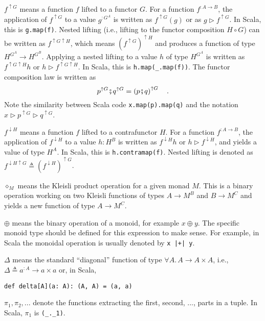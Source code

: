 $f^{\uparrow G}$ means a function $f$ lifted to a functor $G$.
For a function $f^{:A\rightarrow B}$, the application of $f^{\uparrow G}$
to a value $g^{:G^{A}}$ is written as $f^{\uparrow G}(g)$ or as
$g\triangleright f^{\uparrow G}$. In Scala, this is \lstinline!g.map(f)!.
Nested lifting (i.e., lifting to the functor composition $H\circ G$)
can be written as $f^{\uparrow G\uparrow H}$, which means $\left(f^{\uparrow G}\right)^{\uparrow H}$
and produces a function of type $H^{G^{A}}\rightarrow H^{G^{B}}$.
Applying a nested lifting to a value $h$ of type $H^{G^{A}}$ is
written as $f^{\uparrow G\uparrow H}h$ or $h\triangleright f^{\uparrow G\uparrow H}$.
In Scala, this is \lstinline!h.map(_.map(f))!. The functor composition
law is written as
\[
p^{\uparrow G}\bef q^{\uparrow G}=\left(p\bef q\right)^{\uparrow G}\quad.
\]
Note the similarity between Scala code \lstinline!x.map(p).map(q)!
and the notation $x\triangleright p^{\uparrow G}\triangleright q^{\uparrow G}$.

$f^{\downarrow H}$ means a function $f$ lifted to a contrafunctor
$H$. For a function $f^{:A\rightarrow B}$, the application of $f^{\downarrow H}$
to a value $h:H^{B}$ is written as $f^{\downarrow H}h$ or $h\triangleright f^{\downarrow H}$,
and yields a value of type $H^{A}$. In Scala, this is \lstinline!h.contramap(f)!.
Nested lifting is denoted as $f^{\downarrow H\uparrow G}\triangleq(f^{\downarrow H})^{\uparrow G}$.

$\diamond_{M}$ means the Kleisli product operation for a given monad
$M$. This is a binary operation working on two Kleisli functions
of types $A\rightarrow M^{B}$ and $B\rightarrow M^{C}$ and yields
a new function of type $A\rightarrow M^{C}$.

$\oplus$ means the binary operation of a monoid, for example $x\oplus y$.
The specific monoid type should be defined for this expression to
make sense. For example, in Scala the monoidal operation is usually
denoted by \lstinline!x |+| y!.

$\Delta$ means the standard \textsf{``}diagonal\textsf{''} function of type $\forall A.\,A\rightarrow A\times A$,
i.e., $\Delta\triangleq a^{:A}\rightarrow a\times a$ or, in Scala,
\begin{lstlisting}
def delta[A](a: A): (A, A) = (a, a)
\end{lstlisting}

$\pi_{1},\pi_{2},...$ denote the functions extracting the first,
second, ..., parts in a tuple. In Scala, $\pi_{1}$ is \lstinline!(_._1)!.

